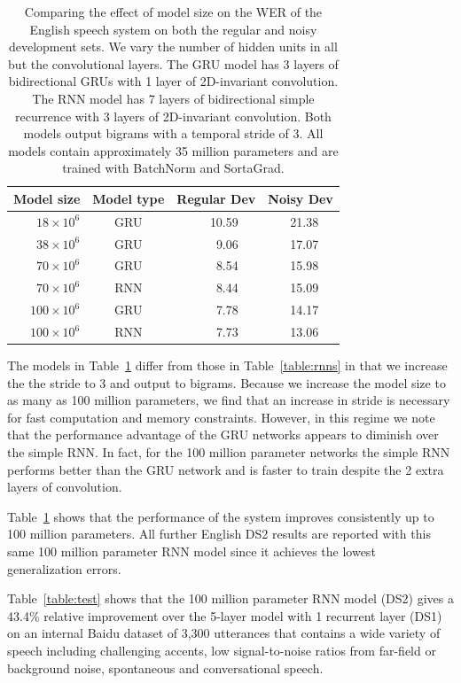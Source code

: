 \documentclass{article}
\begin{document}
\begin{table}
\centering
\begin{tabular}{r  c  r r r  r r r}
\toprule
Model size & Model type & \multicolumn{3}{c}{Regular Dev} & \multicolumn{3}{c}{Noisy Dev} \\
\midrule
$18 \times 10^6$     & GRU &   & 10.59 & &  & 21.38 & \\
$38 \times 10^6$     & GRU &   & 9.06  & &  & 17.07 & \\
$70 \times 10^6$     & GRU &   & 8.54  & &  & 15.98 & \\
$70 \times 10^6$     & RNN &   & 8.44  & &  & 15.09 & \\
$100 \times 10^6$    & GRU &   & 7.78  & &  & 14.17 & \\
$100 \times 10^6$    & RNN &   & 7.73  & &  & 13.06 & \\
\bottomrule
\end{tabular}
\caption{Comparing the effect of model size on the WER of the English speech system on both the regular and noisy development sets. We vary the number of hidden units in all but the convolutional layers. The GRU model has 3 layers of bidirectional GRUs with 1 layer of 2D-invariant convolution. The RNN model has 7 layers of bidirectional simple recurrence with 3 layers of 2D-invariant convolution. Both models output bigrams with a temporal stride of 3. All models contain approximately 35 million parameters and are trained with BatchNorm and SortaGrad.}
\label{table:modelsize}
\end{table}

The models in Table~\ref{table:modelsize} differ from those in Table~\ref{table:rnns} in that we increase the the stride to 3 and output to bigrams. Because we increase the model size to as many as 100 million parameters, we find that an increase in stride is necessary for fast computation and memory constraints. However, in this regime we note that the performance advantage of the GRU networks appears to diminish over the simple RNN. In fact, for the 100 million parameter networks the simple RNN performs better than the GRU network and is faster to train despite the 2 extra layers of convolution.

Table~\ref{table:modelsize} shows that the performance of the system improves consistently up to 100 million parameters. All further English DS2 results are reported with this same 100 million parameter RNN model since it achieves the lowest generalization errors.

Table~\ref{table:test} shows that the 100 million parameter RNN model (DS2) gives a 43.4\% relative improvement over the 5-layer model with 1 recurrent layer (DS1) on an internal Baidu dataset of 3,300 utterances that contains a wide variety of speech including challenging accents, low signal-to-noise ratios from far-field or background noise, spontaneous and conversational speech. 
\end{document}
